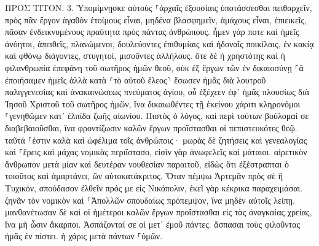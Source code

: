 \documentclass[twoside, 9pt]{extreport}
\begin{document}
ΠΡΟΣ ΤΙΤΟΝ.
3.
Ὑπομίμνῃσκε αὐτοὺς ⸀ἀρχαῖς ἐξουσίαις ὑποτάσσεσθαι πειθαρχεῖν, πρὸς πᾶν ἔργον ἀγαθὸν ἑτοίμους εἶναι, 
μηδένα βλασφημεῖν, ἀμάχους εἶναι, ἐπιεικεῖς, πᾶσαν ἐνδεικνυμένους πραΰτητα πρὸς πάντας ἀνθρώπους. 
ἦμεν γάρ ποτε καὶ ἡμεῖς ἀνόητοι, ἀπειθεῖς, πλανώμενοι, δουλεύοντες ἐπιθυμίαις καὶ ἡδοναῖς ποικίλαις, ἐν κακίᾳ καὶ φθόνῳ διάγοντες, στυγητοί, μισοῦντες ἀλλήλους. 
ὅτε δὲ ἡ χρηστότης καὶ ἡ φιλανθρωπία ἐπεφάνη τοῦ σωτῆρος ἡμῶν θεοῦ, 
οὐκ ἐξ ἔργων τῶν ἐν δικαιοσύνῃ ⸀ἃ ἐποιήσαμεν ἡμεῖς ἀλλὰ κατὰ ⸂τὸ αὐτοῦ ἔλεος⸃ ἔσωσεν ἡμᾶς διὰ λουτροῦ παλιγγενεσίας καὶ ἀνακαινώσεως πνεύματος ἁγίου, 
οὗ ἐξέχεεν ἐφ᾽ ἡμᾶς πλουσίως διὰ Ἰησοῦ Χριστοῦ τοῦ σωτῆρος ἡμῶν, 
ἵνα δικαιωθέντες τῇ ἐκείνου χάριτι κληρονόμοι ⸀γενηθῶμεν κατ᾽ ἐλπίδα ζωῆς αἰωνίου. 
Πιστὸς ὁ λόγος, καὶ περὶ τούτων βούλομαί σε διαβεβαιοῦσθαι, ἵνα φροντίζωσιν καλῶν ἔργων προΐστασθαι οἱ πεπιστευκότες θεῷ. ταῦτά ⸀ἐστιν καλὰ καὶ ὠφέλιμα τοῖς ἀνθρώποις· 
μωρὰς δὲ ζητήσεις καὶ γενεαλογίας καὶ ⸀ἔρεις καὶ μάχας νομικὰς περιΐστασο, εἰσὶν γὰρ ἀνωφελεῖς καὶ μάταιοι. 
αἱρετικὸν ἄνθρωπον μετὰ μίαν καὶ δευτέραν νουθεσίαν παραιτοῦ, 
εἰδὼς ὅτι ἐξέστραπται ὁ τοιοῦτος καὶ ἁμαρτάνει, ὢν αὐτοκατάκριτος. 
Ὅταν πέμψω Ἀρτεμᾶν πρὸς σὲ ἢ Τυχικόν, σπούδασον ἐλθεῖν πρός με εἰς Νικόπολιν, ἐκεῖ γὰρ κέκρικα παραχειμάσαι. 
ζηνᾶν τὸν νομικὸν καὶ ⸀Ἀπολλῶν σπουδαίως πρόπεμψον, ἵνα μηδὲν αὐτοῖς λείπῃ. 
μανθανέτωσαν δὲ καὶ οἱ ἡμέτεροι καλῶν ἔργων προΐστασθαι εἰς τὰς ἀναγκαίας χρείας, ἵνα μὴ ὦσιν ἄκαρποι. 
Ἀσπάζονταί σε οἱ μετ᾽ ἐμοῦ πάντες. ἄσπασαι τοὺς φιλοῦντας ἡμᾶς ἐν πίστει. ἡ χάρις μετὰ πάντων ⸀ὑμῶν. 
\end{document}
